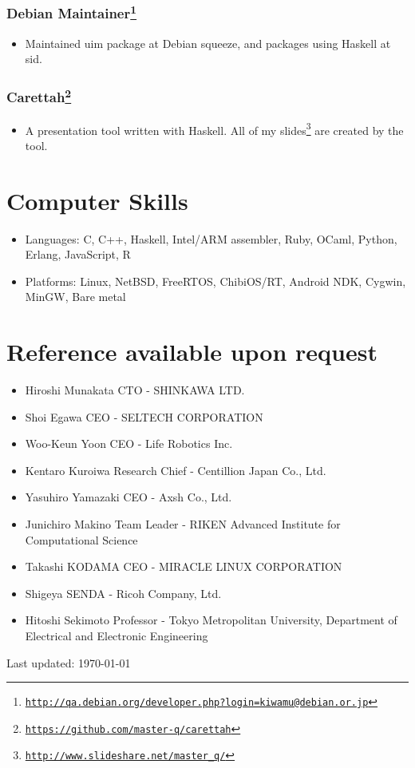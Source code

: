 \documentclass[letterpaper]{article}
\def\footer{
  \begin{center}
    \begin{footnotesize}
      Last updated: \today
    \end{footnotesize}
  \end{center}
}
\begin{document}
\subsubsection*{Debian Maintainer\footnote{\href{http://qa.debian.org/developer.php?login=kiwamu@debian.or.jp}{\tt http://qa.debian.org/developer.php?login=kiwamu@debian.or.jp}}}
\begin{itemize}
\item Maintained uim package at Debian squeeze, and packages using Haskell at sid.
\end{itemize}

\subsubsection*{Carettah\footnote{\href{https://github.com/master-q/carettah}{\tt https://github.com/master-q/carettah}}}
\begin{itemize}
\item A presentation tool written with Haskell. All of my slides\footnote{\href{http://www.slideshare.net/master\_q/}{\tt http://www.slideshare.net/master\_q/}} are created by the tool.
\end{itemize}

\section*{Computer Skills}

\begin{itemize}
  \item Languages: C, C++, Haskell, Intel/ARM assembler, Ruby, OCaml, Python, Erlang, JavaScript, R
  \item Platforms: Linux, NetBSD, FreeRTOS, ChibiOS/RT, Android NDK, Cygwin, MinGW, Bare metal
\end{itemize}

\section*{Reference available upon request}

\begin{itemize}
  \item Hiroshi Munakata CTO - SHINKAWA LTD.
  \item Shoi Egawa CEO - SELTECH CORPORATION
  \item Woo-Keun Yoon CEO - Life Robotics Inc.
  \item Kentaro Kuroiwa Research Chief - Centillion Japan Co., Ltd.
  \item Yasuhiro Yamazaki CEO - Axsh Co., Ltd.
  \item Junichiro Makino Team Leader - RIKEN Advanced Institute for Computational Science
  \item Takashi KODAMA CEO - MIRACLE LINUX CORPORATION
  \item Shigeya SENDA - Ricoh Company, Ltd.
  \item Hitoshi Sekimoto Professor - Tokyo Metropolitan University, Department of Electrical and Electronic Engineering
\end{itemize}

\bigskip
\footer
\end{document}
